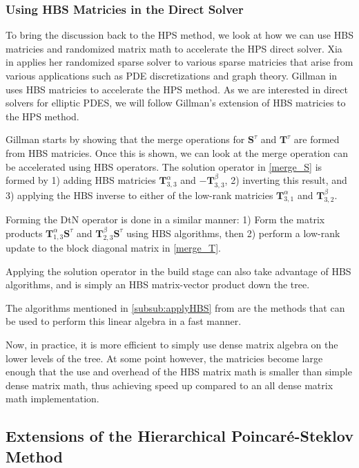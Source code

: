 \subsubsection{Using HBS Matricies in the Direct Solver}

To bring the discussion back to the HPS method, we look at how we can use HBS matricies and randomized matrix math to accelerate the HPS direct solver. Xia in \citep{xia2013randomized} applies her randomized sparse solver to various sparse matricies that arise from various applications such as PDE discretizations and graph theory. Gillman in \citep{gillman2014direct} uses HBS matricies to accelerate the HPS method. As we are interested in direct solvers for elliptic PDES, we will follow Gillman's extension of HBS matricies to the HPS method.

Gillman starts by showing that the merge operations for $\textbf{S}^{\tau}$ and $\textbf{T}^{\tau}$ are formed from HBS matricies. Once this is shown, we can look at the merge operation can be accelerated using HBS operators. The solution operator in \ref{merge_S} is formed by 1) adding HBS matricies $\textbf{T}_{3,3}^{\alpha}$ and $-\textbf{T}_{3,3}^{\beta}$, 2) inverting this result, and 3) applying the HBS inverse to either of the low-rank matricies $\textbf{T}_{3,1}^{\alpha}$ and $\textbf{T}_{3,2}^{\beta}$.

Forming the DtN operator is done in a similar manner: 1) Form the matrix products $\textbf{T}_{1,3}^{\alpha} \textbf{S}^{\tau}$ and $\textbf{T}_{2,3}^{\beta} \textbf{S}^{\tau}$ using HBS algorithms, then 2) perform a low-rank update to the block diagonal matrix in \ref{merge_T}.

Applying the solution operator in the build stage can also take advantage of HBS algorithms, and is simply an HBS matrix-vector product down the tree.

The algorithms mentioned in \ref{subsub:applyHBS} from \citep{gillman2012direct} are the methods that can be used to perform this linear algebra in a fast manner.

Now, in practice, it is more efficient to simply use dense matrix algebra on the lower levels of the tree. At some point however, the matricies become large enough that the use and overhead of the HBS matrix math is smaller than simple dense matrix math, thus achieving speed up compared to an all dense matrix math implementation.

\subsection{Extensions of the Hierarchical Poincaré-Steklov Method}

